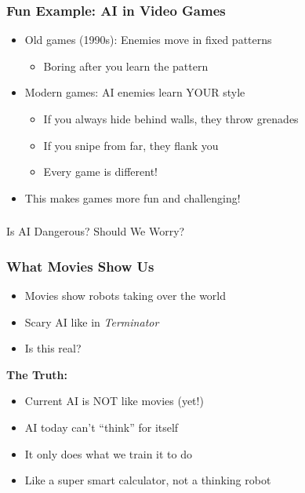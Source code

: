 \begin{frame}[fragile]\frametitle{Fun Example: AI in Video Games}
\begin{itemize}
\item Old games (1990s): Enemies move in fixed patterns
\begin{itemize}
\item Boring after you learn the pattern
\end{itemize}
\item Modern games: AI enemies learn YOUR style
\begin{itemize}
\item If you always hide behind walls, they throw grenades
\item If you snipe from far, they flank you
\item Every game is different!
\end{itemize}
\item This makes games more fun and challenging!
\end{itemize}
\end{frame}

\begin{frame}[fragile]\frametitle{}
\begin{center}
{\Large Is AI Dangerous? Should We Worry?}
\end{center}
\end{frame}

\begin{frame}[fragile]\frametitle{What Movies Show Us}
\begin{itemize}
\item Movies show robots taking over the world
\item Scary AI like in {\em Terminator}
\item Is this real?
\end{itemize}

\vspace{0.5cm}
{\bf The Truth:}
\begin{itemize}
\item Current AI is NOT like movies (yet!)
\item AI today can't ``think'' for itself
\item It only does what we train it to do
\item Like a super smart calculator, not a thinking robot
\end{itemize}
\end{frame}

